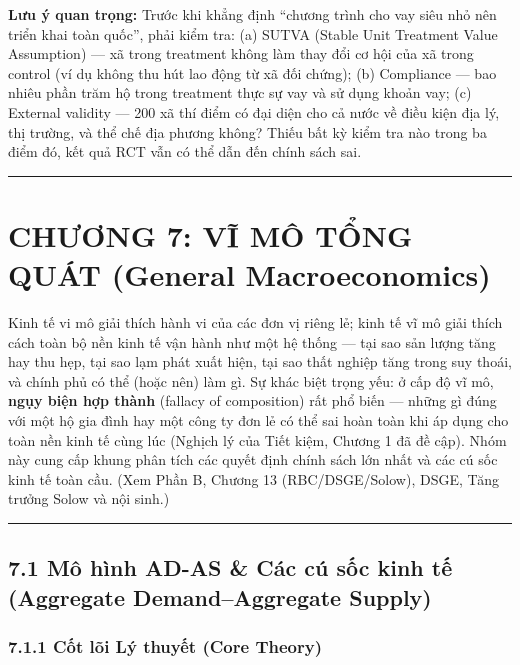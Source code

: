 \documentclass[
]{article}
\begin{document}
\textbf{Lưu ý quan trọng:} Trước khi khẳng định ``chương trình cho vay
siêu nhỏ nên triển khai toàn quốc'', phải kiểm tra: (a) SUTVA (Stable
Unit Treatment Value Assumption) --- xã trong treatment không làm thay
đổi cơ hội của xã trong control (ví dụ không thu hút lao động từ xã đối
chứng); (b) Compliance --- bao nhiêu phần trăm hộ trong treatment thực
sự vay và sử dụng khoản vay; (c) External validity --- 200 xã thí điểm
có đại diện cho cả nước về điều kiện địa lý, thị trường, và thể chế địa
phương không? Thiếu bất kỳ kiểm tra nào trong ba điểm đó, kết quả RCT
vẫn có thể dẫn đến chính sách sai.

\begin{center}\rule{0.5\linewidth}{0.5pt}\end{center}

\section{CHƯƠNG 7: VĨ MÔ TỔNG QUÁT (General
Macroeconomics)}\label{chux1b0ux1a1ng-7-vux129-muxf4-tux1ed5ng-quuxe1t-general-macroeconomics}

Kinh tế vi mô giải thích hành vi của các đơn vị riêng lẻ; kinh tế vĩ mô
giải thích cách toàn bộ nền kinh tế vận hành như một hệ thống --- tại
sao sản lượng tăng hay thu hẹp, tại sao lạm phát xuất hiện, tại sao thất
nghiệp tăng trong suy thoái, và chính phủ có thể (hoặc nên) làm gì. Sự
khác biệt trọng yếu: ở cấp độ vĩ mô, \textbf{ngụy biện hợp thành}
(fallacy of composition) rất phổ biến --- những gì đúng với một hộ gia
đình hay một công ty đơn lẻ có thể sai hoàn toàn khi áp dụng cho toàn
nền kinh tế cùng lúc (Nghịch lý của Tiết kiệm, Chương 1 đã đề cập). Nhóm
này cung cấp khung phân tích các quyết định chính sách lớn nhất và các
cú sốc kinh tế toàn cầu. (Xem Phần B, Chương 13 (RBC/DSGE/Solow), DSGE,
Tăng trưởng Solow và nội sinh.)

\begin{center}\rule{0.5\linewidth}{0.5pt}\end{center}

\subsection{7.1 Mô hình AD-AS \& Các cú sốc kinh tế (Aggregate
Demand--Aggregate
Supply)}\label{muxf4-huxecnh-ad-as-cuxe1c-cuxfa-sux1ed1c-kinh-tux1ebf-aggregate-demandaggregate-supply}

\subsubsection{7.1.1 Cốt lõi Lý thuyết (Core
Theory)}\label{cux1ed1t-luxf5i-luxfd-thuyux1ebft-core-theory-16}
\end{document}
